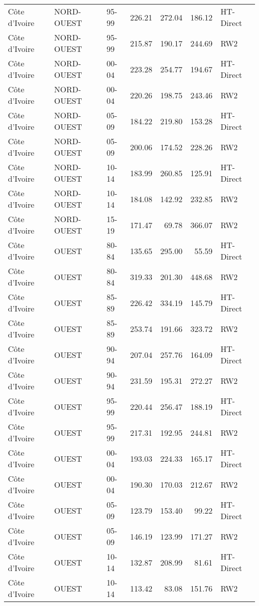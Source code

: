 \begin{longtable}{lllrrrl}
  C\^{o}te d'Ivoire & NORD-OUEST & 95-99 & 226.21 & 272.04 & 186.12 & HT-Direct \\ 
  C\^{o}te d'Ivoire & NORD-OUEST & 95-99 & 215.87 & 190.17 & 244.69 & RW2 \\ 
  C\^{o}te d'Ivoire & NORD-OUEST & 00-04 & 223.28 & 254.77 & 194.67 & HT-Direct \\ 
  C\^{o}te d'Ivoire & NORD-OUEST & 00-04 & 220.26 & 198.75 & 243.46 & RW2 \\ 
  C\^{o}te d'Ivoire & NORD-OUEST & 05-09 & 184.22 & 219.80 & 153.28 & HT-Direct \\ 
  C\^{o}te d'Ivoire & NORD-OUEST & 05-09 & 200.06 & 174.52 & 228.26 & RW2 \\ 
  C\^{o}te d'Ivoire & NORD-OUEST & 10-14 & 183.99 & 260.85 & 125.91 & HT-Direct \\ 
  C\^{o}te d'Ivoire & NORD-OUEST & 10-14 & 184.08 & 142.92 & 232.85 & RW2 \\ 
  C\^{o}te d'Ivoire & NORD-OUEST & 15-19 & 171.47 & 69.78 & 366.07 & RW2 \\ 
  C\^{o}te d'Ivoire & OUEST & 80-84 & 135.65 & 295.00 & 55.59 & HT-Direct \\ 
  C\^{o}te d'Ivoire & OUEST & 80-84 & 319.33 & 201.30 & 448.68 & RW2 \\ 
  C\^{o}te d'Ivoire & OUEST & 85-89 & 226.42 & 334.19 & 145.79 & HT-Direct \\ 
  C\^{o}te d'Ivoire & OUEST & 85-89 & 253.74 & 191.66 & 323.72 & RW2 \\ 
  C\^{o}te d'Ivoire & OUEST & 90-94 & 207.04 & 257.76 & 164.09 & HT-Direct \\ 
  C\^{o}te d'Ivoire & OUEST & 90-94 & 231.59 & 195.31 & 272.27 & RW2 \\ 
  C\^{o}te d'Ivoire & OUEST & 95-99 & 220.44 & 256.47 & 188.19 & HT-Direct \\ 
  C\^{o}te d'Ivoire & OUEST & 95-99 & 217.31 & 192.95 & 244.81 & RW2 \\ 
  C\^{o}te d'Ivoire & OUEST & 00-04 & 193.03 & 224.33 & 165.17 & HT-Direct \\ 
  C\^{o}te d'Ivoire & OUEST & 00-04 & 190.30 & 170.03 & 212.67 & RW2 \\ 
  C\^{o}te d'Ivoire & OUEST & 05-09 & 123.79 & 153.40 & 99.22 & HT-Direct \\ 
  C\^{o}te d'Ivoire & OUEST & 05-09 & 146.19 & 123.99 & 171.27 & RW2 \\ 
  C\^{o}te d'Ivoire & OUEST & 10-14 & 132.87 & 208.99 & 81.61 & HT-Direct \\ 
  C\^{o}te d'Ivoire & OUEST & 10-14 & 113.42 & 83.08 & 151.76 & RW2 \\ 

\end{longtable}
